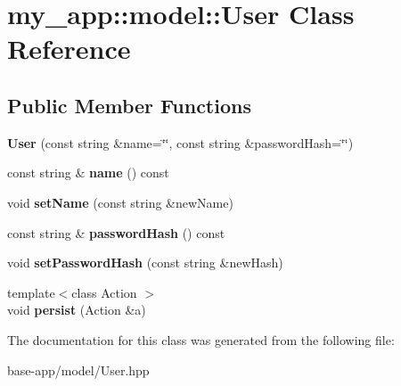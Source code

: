 \hypertarget{classmy__app_1_1model_1_1User}{
\section{my\_\-app::model::User Class Reference}
\label{classmy__app_1_1model_1_1User}
}
\subsection*{Public Member Functions}
\begin{DoxyCompactItemize}
\item 
\hypertarget{classmy__app_1_1model_1_1User_af3a49a7826a3cadef30ce23c3ce9ac4a}{
{\bfseries User} (const string \&name=\char`\"{}\char`\"{}, const string \&passwordHash=\char`\"{}\char`\"{})}
\label{classmy__app_1_1model_1_1User_af3a49a7826a3cadef30ce23c3ce9ac4a}

\item 
\hypertarget{classmy__app_1_1model_1_1User_a56ad199d09f4f3d86151a537df621450}{
const string \& {\bfseries name} () const }
\label{classmy__app_1_1model_1_1User_a56ad199d09f4f3d86151a537df621450}

\item 
\hypertarget{classmy__app_1_1model_1_1User_a2c0e668b5292732da6f8cc6efd42981d}{
void {\bfseries setName} (const string \&newName)}
\label{classmy__app_1_1model_1_1User_a2c0e668b5292732da6f8cc6efd42981d}

\item 
\hypertarget{classmy__app_1_1model_1_1User_a77fdca1f1b2aa9af65696b6222164fa3}{
const string \& {\bfseries passwordHash} () const }
\label{classmy__app_1_1model_1_1User_a77fdca1f1b2aa9af65696b6222164fa3}

\item 
\hypertarget{classmy__app_1_1model_1_1User_a90a08399b2cd95db4b0ab0892a560b96}{
void {\bfseries setPasswordHash} (const string \&newHash)}
\label{classmy__app_1_1model_1_1User_a90a08399b2cd95db4b0ab0892a560b96}

\item 
\hypertarget{classmy__app_1_1model_1_1User_a6a24be6f1e67d01a0ee721e0cb4f0af8}{
{\footnotesize template$<$class Action $>$ }\\void {\bfseries persist} (Action \&a)}
\label{classmy__app_1_1model_1_1User_a6a24be6f1e67d01a0ee721e0cb4f0af8}

\end{DoxyCompactItemize}


The documentation for this class was generated from the following file:\begin{DoxyCompactItemize}
\item 
base-\/app/model/User.hpp\end{DoxyCompactItemize}
